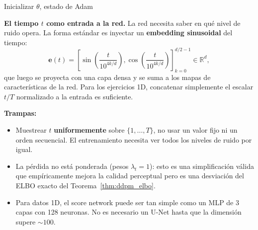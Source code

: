\begin{algorithm}[H]
\caption{Entrenamiento por denoising score matching (DDPM)}
\label{alg:ap_dsm}

Inicializar $\theta$, estado de Adam\;
\end{algorithm}

\noindent\textbf{El tiempo $t$ como entrada a la red.} La red necesita saber
en qué nivel de ruido opera. La forma estándar es inyectar un \textbf{embedding
sinusoidal} del tiempo:
\[
  \bm{e}(t) = \left[\sin\!\left(\frac{t}{10^{4k/d}}\right),
  \cos\!\left(\frac{t}{10^{4k/d}}\right)\right]_{k=0}^{d/2-1}\in\mathbb{R}^d,
\]
que luego se proyecta con una capa densa y se suma a los mapas de características
de la red. Para los ejercicios 1D, concatenar simplemente el escalar $t/T$
normalizado a la entrada es suficiente.

\medskip
\noindent\textbf{Trampas:}
\begin{itemize}
  \item Muestrear $t$ \textbf{uniformemente} sobre $\{1,\ldots,T\}$, no usar
        un valor fijo ni un orden secuencial. El entrenamiento necesita ver todos
        los niveles de ruido por igual.
  \item La pérdida no está ponderada (pesos $\lambda_t = 1$): esto es una
        simplificación válida que empíricamente mejora la calidad perceptual
        pero es una desviación del ELBO exacto del Teorema~\ref{thm:ddpm_elbo}.
  \item Para datos 1D, el score network puede ser tan simple como un MLP de 3
        capas con 128 neuronas. No es necesario un U-Net hasta que la dimensión
        supere $\sim 100$.
\end{itemize}

